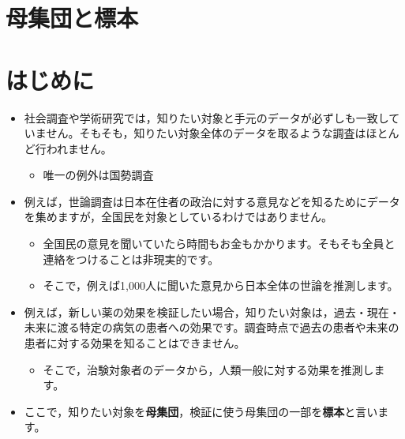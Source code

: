 \documentclass[
  letterpaper,
  DIV=11,
  numbers=noendperiod]{scrreprt}
\author{}
\date{}
\providecommand{\tightlist}{%
  \setlength{\itemsep}{0pt}\setlength{\parskip}{0pt}}\usepackage{longtable,booktabs,array}
\begin{document}
\ifdefined\Shaded\renewenvironment{Shaded}{\begin{tcolorbox}[frame hidden, interior hidden, enhanced, sharp corners, borderline west={3pt}{0pt}{shadecolor}, boxrule=0pt, breakable]}{\end{tcolorbox}}\fi

\hypertarget{ux6bcdux96c6ux56e3ux3068ux6a19ux672c}{%
\section{母集団と標本}\label{ux6bcdux96c6ux56e3ux3068ux6a19ux672c}}

\hypertarget{ux306fux3058ux3081ux306b}{%
\section{はじめに}\label{ux306fux3058ux3081ux306b}}

\begin{itemize}
\item
  社会調査や学術研究では，知りたい対象と手元のデータが必ずしも一致していません。そもそも，知りたい対象全体のデータを取るような調査はほとんど行われません。

  \begin{itemize}
  \tightlist
  \item
    唯一の例外は国勢調査
  \end{itemize}
\item
  例えば，世論調査は日本在住者の政治に対する意見などを知るためにデータを集めますが，全国民を対象としているわけではありません。

  \begin{itemize}
  \item
    全国民の意見を聞いていたら時間もお金もかかります。そもそも全員と連絡をつけることは非現実的です。
  \item
    そこで，例えば1,000人に聞いた意見から日本全体の世論を推測します。
  \end{itemize}
\item
  例えば，新しい薬の効果を検証したい場合，知りたい対象は，過去・現在・未来に渡る特定の病気の患者への効果です。調査時点で過去の患者や未来の患者に対する効果を知ることはできません。

  \begin{itemize}
  \tightlist
  \item
    そこで，治験対象者のデータから，人類一般に対する効果を推測します。
  \end{itemize}
\item
  ここで，知りたい対象を\textbf{母集団}，検証に使う母集団の一部を\textbf{標本}と言います。
\end{itemize}
\end{document}

